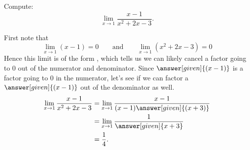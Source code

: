 \documentclass{ximera}
\begin{document}
\begin{example}
  Compute:
  \[
  \lim_{x\to1}\frac{x-1}{x^2+2x-3}.
  \]
  \begin{explanation}
    First note that
    \[
    \lim_{x\to1}\left(x-1\right)=0 \qquad\text{and}\qquad  \lim_{x\to1}\left(x^2+2x-3\right) = 0
    \]
    Hence this limit is of the form \zeroOverZero, which tells us we
    can likely cancel a factor going to $0$ out of the numerator and
    denominator.  Since $\answer[given]{(x-1)}$ is a factor going to $0$ in the
    numerator, let's see if we can factor a $\answer[given]{(x-1)}$ out of the
    denominator as well.
    \begin{align*}
      \lim_{x\to1}\frac{x-1}{x^2+2x-3}&=\lim_{x\to1}\frac{x-1}{(x-1)\answer[given]{(x+3)}} \\
      &=\lim_{x\to1}\frac{1}{\answer[given]{x+3}}\\
      &=\frac{1}{4}.
    \end{align*}
  \end{explanation}
\end{example}
\end{document}
